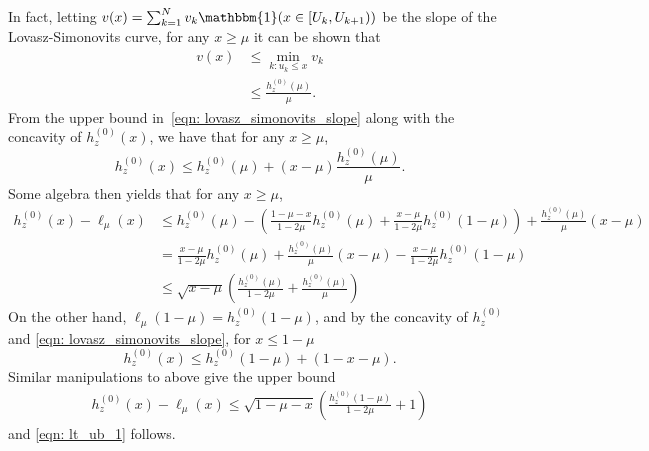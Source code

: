 \documentclass[11pt,twoside]{article}
\theoremstyle{definition}
\newcommand{\1}{\mathbbm{1}}
\begin{document}
In fact, letting $v(x) = \sum_{k = 1}^{N} v_k \1(x \in [U_k, U_{k+1}) )$ be the slope of the Lovasz-Simonovits curve, for any $x \geq \mu$ it can be shown that
\begin{align}
v(x) & \leq \min_{k: u_k \leq x} v_k \nonumber  \\
& \leq \frac{h_z^{(0)}(\mu)}{\mu}. \label{eqn: lovasz_simonovits_slope}
\end{align}
From the upper bound in~\eqref{eqn: lovasz_simonovits_slope} along with the concavity of $h_z^{(0)}(x)$, we have that for any $x \geq \mu$,
\begin{equation*}
h_z^{(0)}(x) \leq h_z^{(0)}(\mu) + (x - \mu)\frac{h_z^{(0)}(\mu)}{\mu}.
\end{equation*}
Some algebra then yields that for any $x \geq \mu$,
\begin{align*}
h_z^{(0)}(x) - \ell_{\mu}(x) & \leq h_z^{(0)}(\mu) - \left(\frac{1 - \mu - x}{1 - 2\mu} h_z^{(0)}(\mu) + \frac{x - \mu}{1 - 2\mu} h_z^{(0)}(1 - \mu)\right) + \frac{h_z^{(0)}(\mu)}{\mu}(x - \mu) \\
& =  \frac{x - \mu}{1 - 2\mu}h_z^{(0)}(\mu) + \frac{h_z^{(0)}(\mu)}{\mu} (x - \mu) - \frac{x - \mu}{1 - 2\mu} h_z^{(0)}(1 - \mu) \\
& \leq \sqrt{x - \mu} \left(\frac{h_z^{(0)}(\mu)}{1 - 2\mu} + \frac{h_z^{(0)}(\mu)}{\mu} \right)
\end{align*}
On the other hand, $\ell_{\mu}(1 - \mu) = h_z^{(0)}(1 - \mu)$, and by the concavity of $h_z^{(0)}$ and \eqref{eqn: lovasz_simonovits_slope},  for $x \leq 1 - \mu$
\begin{equation*}
h_z^{(0)}(x) \leq h_z^{(0)}(1 - \mu) + (1 - x - \mu).
\end{equation*}
Similar manipulations to above give the upper bound
\begin{align*}
h_z^{(0)}(x) - \ell_{\mu}(x) \leq \sqrt{1 - \mu - x}\left(\frac{h_z^{(0)}(1 - \mu) }{1 - 2\mu} + 1\right)
\end{align*}
and \eqref{eqn: lt_ub_1} follows.
\end{document}
